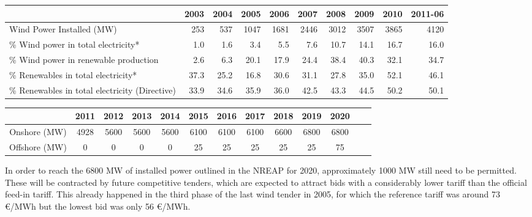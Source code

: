 \begin{table}[!htp]
\small
\centering
{}
\label{tb:dgeg}
\begin{tabular}{p{5cm}rrrrrrrrr}
\toprule
                                      & 2003 & 2004 & 2005 & 2006 & 2007 & 2008 & 2009 & 2010 & 2011-06 \\
\midrule
Wind Power Installed (MW)             & 253  & 537  & 1047 & 1681 & 2446 & 3012 & 3507 & 3865 & 4120 \\
\% Wind power in total electricity*   & 1.0 & 1.6 & 3.4 & 5.5 & 7.6 & 10.7 & 14.1 & 16.7 & 16.0 \\
\% Wind power in renewable production     & 2.6  & 6.3  & 20.1 & 17.9 & 24.4 & 38.4 & 40.3 & 32.1 & 34.7 \\
\midrule
\% Renewables in total electricity*   & 37.3 & 25.2 & 16.8 & 30.6 & 31.1 & 27.8 & 35.0 & 52.1 &  46.1 \\
\% Renewables in total electricity (Directive)   & 33.9 & 34.6 & 35.9 & 36.0 & 42.5 & 43.3 & 44.5 & 50.2 & 50.1 \\
\bottomrule
\end{tabular}
\end{table}

\begin{table}[!htp]
\small
\centering
{}
\label{tb:tgn}
\begin{tabular}{ccccccccccccc}
\toprule
              & 2011 & 2012 & 2013 & 2014 & 2015 & 2016 & 2017 & 2018 & 2019 & 2020 \\
\midrule
Onshore (MW)  & 4928 & 5600 & 5600 & 5600 & 6100 & 6100 & 6100 & 6600 & 6800 & 6800 \\
Offshore (MW) & 0    & 0    & 0    & 0    & 25   & 25   & 25   & 25   & 25   & 75 \\
\bottomrule
\end{tabular}
\end{table}
\FloatBarrier

In order to reach the 6800 MW of installed power outlined in the NREAP for 2020, approximately 1000 MW still need to be permitted. These will be contracted by future competitive tenders, which are expected to attract bids with a considerably lower tariff than the official feed-in tariff. This already happened in the third phase of the last wind tender in 2005, for which the reference tariff was around 73 \euro/MWh but the lowest bid was only 56 \euro/MWh. 

